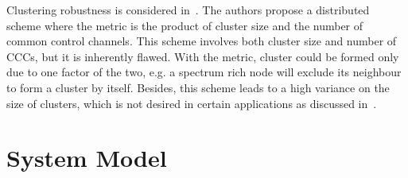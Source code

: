 \documentclass[10pt,journal,compsoc]{IEEEtran}
\theoremstyle{mytheoremstyle}
\theoremstyle{mytheoremstyle}
\theoremstyle{mytheoremstyle}
\begin{document}
Clustering robustness is considered in~\cite{Lazos09, LIU_TMC11_2}.
The authors propose a distributed scheme where the metric is the product of cluster size and the number of common control channels.
This scheme involves both cluster size and number of CCCs, but it is inherently flawed.
With the metric, cluster could be formed only due to one factor of the two, e.g. a spectrum rich node will exclude its neighbour to form a cluster by itself.
Besides, this scheme leads to a high variance on the size of clusters, which is not desired in certain applications as discussed in~\cite{clustering_globecom11, cluster_EW10}.



\section{System Model}
\label{sec:model}
\end{document}
